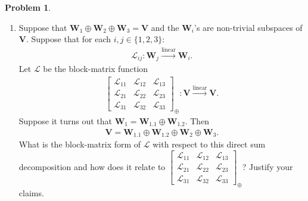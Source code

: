 \documentclass{book}
\theoremstyle{definition}
\newtheorem*{prob*}{Problem}
\newcommand{\V}{\mathbf{V}}
\newcommand{\W}{\mathbf{W}}
\newcommand{\lag}{\mathcal{L}}
\newcommand{\lin}{\overset{\text{linear}}{\longrightarrow}}
\begin{document}
\begin{prob*}
\begin{enumerate}
	\item Suppose that $\W_1\oplus\W_2\oplus\W_3 = \V$ and the $\W_i$'s are non-trivial subspaces of $\V$. Suppose that for each $i,j\in \{1,2,3\}$:
	\begin{align*}
	\lag_{ij} : \W_j \lin \W_i.
	\end{align*} 
	Let $\lag$ be the block-matrix function
	\begin{align*}
	\begin{bmatrix}
	\lag_{11} & \lag_{12} & \lag_{13}\\
	\lag_{21} & \lag_{22} & \lag_{23}\\
	\lag_{31} & \lag_{32} & \lag_{33}
	\end{bmatrix}_\oplus : \V \lin \V.
	\end{align*}
	Suppose it turns out that $\W_1 = \W_{1.1}\oplus \W_{1.2}$. Then
	\begin{align*}
	\V = \W_{1.1}\oplus \W_{1.2} \oplus \W_2 \oplus \W_3.
	\end{align*}
	What is the block-matrix form of $\lag$ with respect to this direct sum decomposition and how does it relate to $\begin{bmatrix}
	\lag_{11} & \lag_{12} & \lag_{13}\\
	\lag_{21} & \lag_{22} & \lag_{23}\\
	\lag_{31} & \lag_{32} & \lag_{33}
	\end{bmatrix}_\oplus$? Justify your claims.\\	
	\end{enumerate}



\end{prob*}
\end{document}

